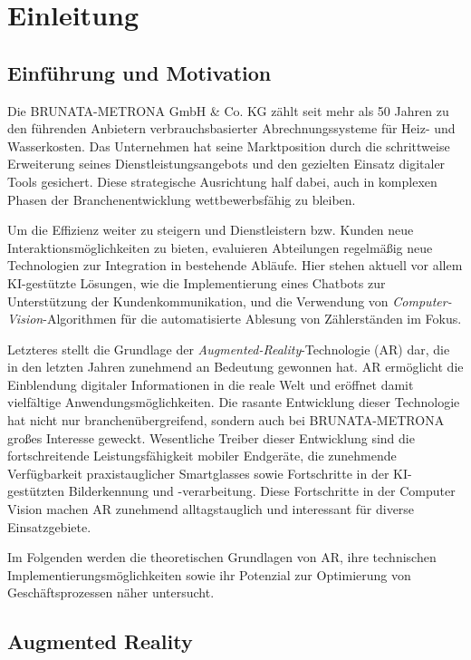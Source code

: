 \chapter{Einleitung}

\section{Einführung und Motivation}

Die BRUNATA-METRONA GmbH \& Co. KG zählt seit mehr als 50 Jahren zu den führenden Anbietern verbrauchsbasierter Abrechnungssysteme für Heiz- und Wasserkosten. Das Unternehmen hat seine Marktposition durch die schrittweise Erweiterung seines Dienstleistungsangebots und den gezielten Einsatz digitaler Tools gesichert. Diese strategische Ausrichtung half dabei, auch in komplexen Phasen der Branchenentwicklung wettbewerbsfähig zu bleiben.

Um die Effizienz weiter zu steigern und Dienstleistern bzw. Kunden neue Interaktionsmöglichkeiten zu bieten, evaluieren Abteilungen regelmäßig neue Technologien zur Integration in bestehende Abläufe. Hier stehen aktuell vor allem KI-gestützte Lösungen, wie die Implementierung eines Chatbots zur Unterstützung der Kundenkommunikation, und die Verwendung von \emph{Computer-Vision}-Algorithmen für die automatisierte Ablesung von Zählerständen im Fokus.

Letzteres stellt die Grundlage der \emph{Augmented-Reality}-Technologie (AR) dar, die in den letzten Jahren zunehmend an Bedeutung gewonnen hat. AR ermöglicht die Einblendung digitaler Informationen in die reale Welt und eröffnet damit vielfältige Anwendungsmöglichkeiten. Die rasante Entwicklung dieser Technologie hat nicht nur branchenübergreifend, sondern auch bei BRUNATA-METRONA großes Interesse geweckt. Wesentliche Treiber dieser Entwicklung sind die fortschreitende Leistungsfähigkeit mobiler Endgeräte, die zunehmende Verfügbarkeit praxistauglicher Smartglasses sowie Fortschritte in der KI-gestützten Bilderkennung und \linebreak-verarbeitung. Diese Fortschritte in der Computer Vision machen AR zunehmend alltagstauglich und interessant für diverse Einsatzgebiete. \cite{verma2022advances, boulanger2024applications, doerner2022virtual}

Im Folgenden werden die theoretischen Grundlagen von AR, ihre technischen Implementierungsmöglichkeiten sowie ihr Potenzial zur Optimierung von Geschäftsprozessen näher untersucht.

\section{Augmented Reality}

